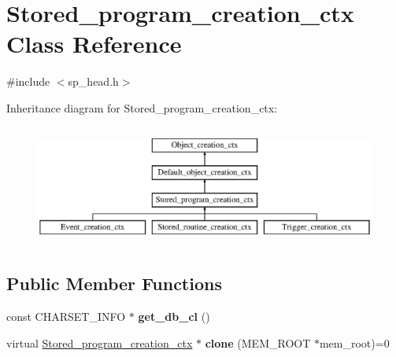 \hypertarget{classStored__program__creation__ctx}{}\section{Stored\+\_\+program\+\_\+creation\+\_\+ctx Class Reference}
\label{classStored__program__creation__ctx}


{\ttfamily \#include $<$sp\+\_\+head.\+h$>$}

Inheritance diagram for Stored\+\_\+program\+\_\+creation\+\_\+ctx\+:\begin{figure}[H]
\begin{center}
\leavevmode
\includegraphics[height=3.992870cm]{classStored__program__creation__ctx}
\end{center}
\end{figure}
\subsection*{Public Member Functions}
\begin{DoxyCompactItemize}
\item 
\mbox{\label{classStored__program__creation__ctx_a389842c6c04e28135e3de01be496e422}} 
const C\+H\+A\+R\+S\+E\+T\+\_\+\+I\+N\+FO $\ast$ {\bfseries get\+\_\+db\+\_\+cl} ()
\item 
\mbox{\label{classStored__program__creation__ctx_a9602b9a2d803e632314e6dfadaa7a068}} 
virtual \mbox{\hyperlink{classStored__program__creation__ctx}{Stored\+\_\+program\+\_\+creation\+\_\+ctx}} $\ast$ {\bfseries clone} (M\+E\+M\+\_\+\+R\+O\+OT $\ast$mem\+\_\+root)=0
\end{DoxyCompactItemize}
